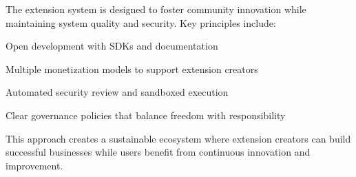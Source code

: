 The extension system is designed to foster community innovation while maintaining system quality and security. Key principles include:

\begin{compactlist}
    \item Open development with SDKs and documentation
    \item Multiple monetization models to support extension creators
    \item Automated security review and sandboxed execution
    \item Clear governance policies that balance freedom with responsibility
\end{compactlist}

This approach creates a sustainable ecosystem where extension creators can build successful businesses while users benefit from continuous innovation and improvement.
